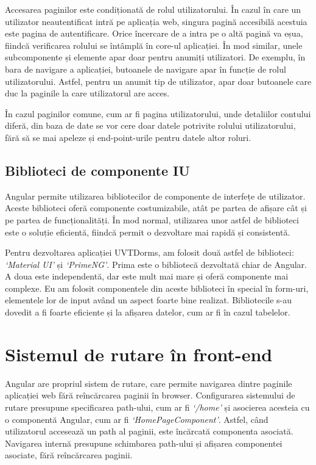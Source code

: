 \documentclass[12pt,a4paper]{report}
\theoremstyle{definition}
\theoremstyle{remark}
\begin{document}
\par Accesarea paginilor este condiționată de rolul utilizatorului. În cazul în care un utilizator neautentificat intră pe aplicația web, singura pagină accesibilă acestuia este pagina de autentificare. Orice încercare de a intra pe o altă pagină va eșua, fiindcă verificarea rolului se întâmplă în core-ul aplicației. În mod similar, unele subcomponente și elemente apar doar pentru anumiți utilizatori. De exemplu, în bara de navigare a aplicației, butoanele de navigare apar în funcție de rolul utilizatorului. Astfel, pentru un anumit tip de utilizator, apar doar butoanele care duc la paginile la care utilizatorul are acces.

\par În cazul paginilor comune, cum ar fi pagina utilizatorului, unde detaliilor contului diferă, din baza de date se vor cere doar datele potrivite rolului utilizatorului, fără să se mai apeleze și end-point-urile pentru datele altor roluri.

\subsection{Biblioteci de componente IU}

\par Angular permite utilizarea bibliotecilor de componente de interfețe de utilizator. Aceste biblioteci oferă componente costumizabile, atât pe partea de afișare cât și pe partea de funcționalități. În mod normal, utilizarea unor astfel de biblioteci este o soluție eficientă, fiindcă permit o dezvoltare mai rapidă și consistentă.

\par Pentru dezvoltarea aplicației UVTDorms, am folosit două astfel de biblioteci: \textit{`Material UI'}\cite{material_ui_angular} și \textit{`PrimeNG'}\cite{prime_ng_home}. Prima este o bibliotecă dezvoltată chiar de Angular. A doua este independentă, dar este mult mai mare și oferă componente mai complexe. Eu am folosit componentele din aceste biblioteci în special în form-uri, elementele lor de input având un aspect foarte bine realizat. Bibliotecile s-au dovedit a fi foarte eficiente și la afișarea datelor, cum ar fi în cazul tabelelor. 

\section{Sistemul de rutare în front-end}

\par Angular are propriul sistem de rutare, care permite navigarea dintre paginile \textnormal{ap\-li\-ca\-ți\-ei} web fără reîncărcarea paginii în browser. Configurarea sistemului de rutare presupune specificarea path-ului, cum ar fi \textit{`/home'} și asocierea acesteia cu o componentă Angular, cum ar fi \textit{`HomePageComponent'}. Astfel, când utilizatorul accesează un path al paginii, este încărcată componenta asociată. Navigarea internă presupune schimbarea path-ului și afișarea componentei asociate, fără reîncărcarea paginii.
\end{document}
